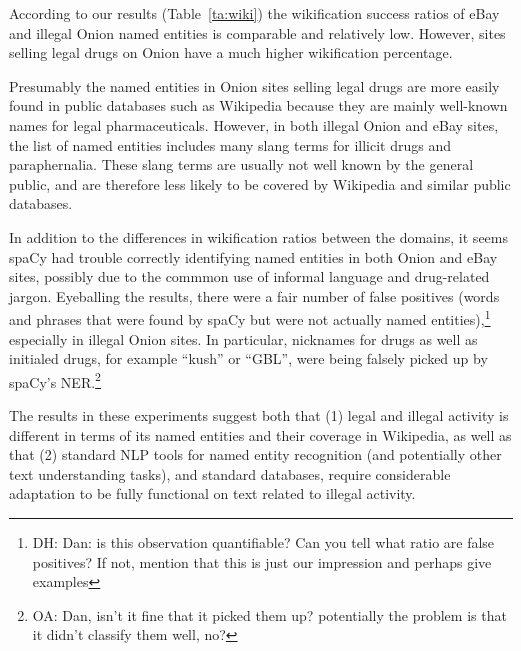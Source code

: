 \documentclass[11pt,a4paper,table]{article}
\newcommand{\oa}[1]{\footnote{\color{red}OA: #1}}
\newcommand{\daniel}[1]{\footnote{\color{brown}DH: #1}}
\newcommand{\daneldad}[1]{\footnote{\color{green}DE: #1}}
\begin{document}
According to our results (Table~\ref{ta:wiki}) the wikification success ratios of eBay and illegal Onion named entities is comparable and relatively low. However, sites selling legal drugs on Onion have a much higher wikification percentage.

Presumably the named entities in Onion sites selling legal drugs are
more easily found in public databases such as Wikipedia because they
are mainly well-known names for legal pharmaceuticals. However, in
both illegal Onion and eBay sites, the list of named entities includes
many slang terms for illicit drugs and paraphernalia. These slang terms
are usually not well known by the general public, and are therefore
less likely to be covered by Wikipedia and similar public databases.

In addition to the differences in wikification ratios between
the domains, it seems spaCy had trouble correctly identifying
named entities in both Onion and eBay sites, possibly
due to the commmon use of informal language and drug-related jargon.
Eyeballing the results, there were a fair number of false positives (words and phrases that were found by spaCy but were not actually named entities),\daniel{Dan: is this observation
quantifiable? Can you tell what ratio are false positives? If not,
mention that this is just our impression and perhaps give examples}
especially in illegal Onion sites. In particular, nicknames for drugs as well as initialed drugs, for example ``kush'' or ``GBL'', 
were being falsely picked up by spaCy's NER.\oa{Dan, isn't it fine that it picked them up? potentially the problem is that it didn't classify them well, no?}

 The results in these experiments suggest both that (1) legal and illegal activity is different in terms of its named entities and their coverage in Wikipedia, as well as that (2) standard NLP tools for named entity recognition (and potentially other text understanding tasks), and standard databases, require considerable adaptation to be fully functional on text related to illegal activity. 

\end{document}
